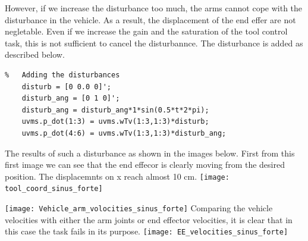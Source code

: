 \documentclass{article}
\begin{document}
However, if we increase the disturbance too much, the arms cannot cope with the disturbance in the vehicle. As a result, the displacement of the end effer are not negletable. Even if we increase the gain and the saturation of the tool control task, this is not sufficient to cancel the disturbannce.  The disturbance is added as described below.
\begin{lstlisting}
%	Adding the disturbances
    disturb = [0 0.0 0]';
    disturb_ang = [0 1 0]';
    disturb_ang = disturb_ang*1*sin(0.5*t*2*pi);
    uvms.p_dot(1:3) = uvms.wTv(1:3,1:3)*disturb;
    uvms.p_dot(4:6) = uvms.wTv(1:3,1:3)*disturb_ang;
\end{lstlisting}
The results of such a disturbance as shown in the images below.
First from this first image we can see that the end effecor is clearly moving from the 
desired position. The displacemnts on x reach almost 10 cm. 
\texttt{[image: tool\_coord\_sinus\_forte]}
\centering

\texttt{[image: Vehicle\_arm\_volocities\_sinus\_forte]}
\centering
Comparing the vehicle velocities with either the arm joints or end effector velocities, it is clear that in this case the task fails in its purpose. 
\texttt{[image: EE\_velocities\_sinus\_forte]}
\centering



















\end{document}
